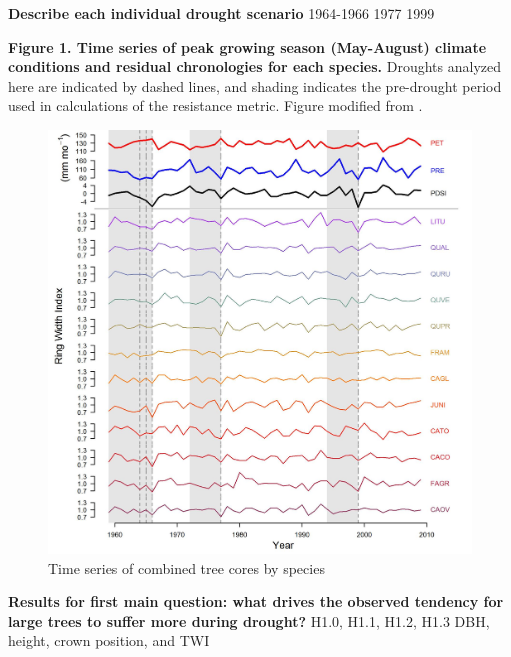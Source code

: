 \documentclass[]{article}
\begin{document}
\textbf{Describe each individual drought scenario } 1964-1966 1977 1999

\textbf{Figure 1. Time series of peak growing season (May-August)
climate conditions and residual chronologies for each species.} Droughts
analyzed here are indicated by dashed lines, and shading indicates the
pre-drought period used in calculations of the resistance metric. Figure
modified from \citep{helcoski_growing_2019}.

\begin{figure}[htbp]
\centering
\includegraphics[width=5.20833in]{tables_figures/Figure1.jpg}
\caption{Time series of combined tree cores by species}
\end{figure}

\textbf{Results for first main question: what drives the observed
tendency for large trees to suffer more during drought?} H1.0, H1.1,
H1.2, H1.3 DBH, height, crown position, and TWI
\end{document}
